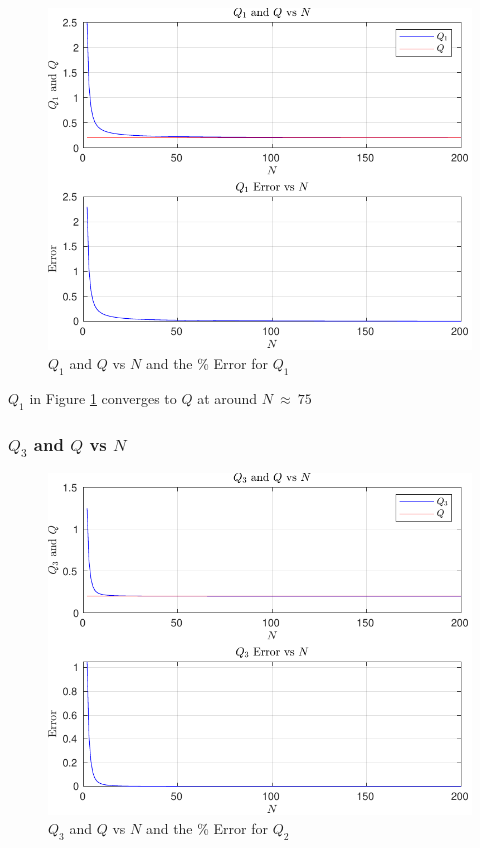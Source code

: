 \documentclass[12pt]{article}
\begin{document}
				\begin{figure}[H]
					\centering
					\includegraphics[width=1\linewidth]{Code/Fig/q1_sum_error_plot.pdf}
					\caption{\Large $Q_{1}$ and $Q$ vs $N$ and the \% Error for $Q_{1}$}
					\label{fig:q1sumerrorplot}
				\end{figure}	
				 $Q_{1}$ in Figure \ref{fig:q1sumerrorplot} converges to $Q$ at around $N \ \approx \ 75$	
				 \newpage
			\subsubsection{$Q_{3}$ and $Q$ vs $N$}
				
				
				
				\begin{figure}[H]
					\centering
					\includegraphics[width=1\linewidth]{Code/Fig/q3_sum_error_plot.pdf}
					\caption{\Large $Q_{3}$ and $Q$ vs $N$ and the \% Error for $Q_{2}$}
					\label{fig:q2sumerrorplot}
				\end{figure}
				
\end{document}

